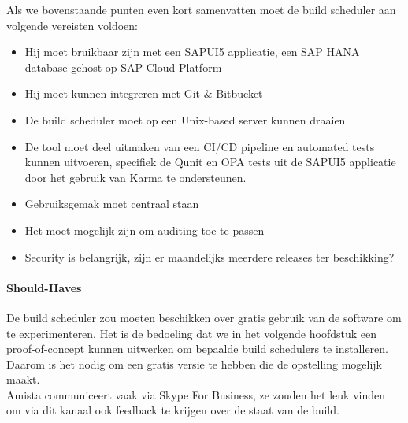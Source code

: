             Als we bovenstaande punten even kort samenvatten moet de build scheduler aan volgende vereisten voldoen:
            \begin{itemize}
                \item Hij moet bruikbaar zijn met een SAPUI5 applicatie, een SAP HANA database gehost op SAP Cloud Platform
                \item Hij moet kunnen integreren met Git \& Bitbucket
                \item De build scheduler moet op een Unix-based server kunnen draaien
                \item De tool moet deel uitmaken van een CI/CD pipeline en automated tests kunnen uitvoeren, specifiek de Qunit en OPA tests uit de SAPUI5 applicatie door het gebruik van Karma te ondersteunen.
                \item Gebruiksgemak moet centraal staan
                \item Het moet mogelijk zijn om auditing toe te passen
                \item Security is belangrijk, zijn er maandelijks meerdere releases ter beschikking?
            \end{itemize}
            
            
            \paragraph{Should-Haves}
            De build scheduler zou moeten beschikken over gratis gebruik van de software om te experimenteren. Het is de bedoeling dat we in het volgende hoofdstuk een proof-of-concept kunnen uitwerken om bepaalde build schedulers te installeren. Daarom is het nodig om een gratis versie te hebben die de opstelling mogelijk maakt.\\
            Amista communiceert vaak via Skype For Business, ze zouden het leuk vinden om via dit kanaal ook feedback te krijgen over de staat van de build.
            
            
